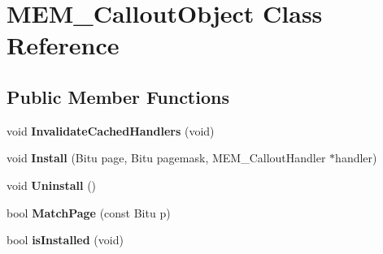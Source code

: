 \hypertarget{classMEM__CalloutObject}{\section{M\-E\-M\-\_\-\-Callout\-Object Class Reference}
\label{classMEM__CalloutObject}
}
\subsection*{Public Member Functions}
\begin{DoxyCompactItemize}
\item 
\hypertarget{classMEM__CalloutObject_aec2629c0c8e37f437ff88b811b72f4aa}{void {\bfseries Invalidate\-Cached\-Handlers} (void)}\label{classMEM__CalloutObject_aec2629c0c8e37f437ff88b811b72f4aa}

\item 
\hypertarget{classMEM__CalloutObject_abfc4ec4ff30364d9eee602bd0bc0258e}{void {\bfseries Install} (Bitu page, Bitu pagemask, M\-E\-M\-\_\-\-Callout\-Handler $\ast$handler)}\label{classMEM__CalloutObject_abfc4ec4ff30364d9eee602bd0bc0258e}

\item 
\hypertarget{classMEM__CalloutObject_ae18addfdccf0102276d0f8feac83cae9}{void {\bfseries Uninstall} ()}\label{classMEM__CalloutObject_ae18addfdccf0102276d0f8feac83cae9}

\item 
\hypertarget{classMEM__CalloutObject_a23fd9d61bb269101263cb95bb2f73e2d}{bool {\bfseries Match\-Page} (const Bitu p)}\label{classMEM__CalloutObject_a23fd9d61bb269101263cb95bb2f73e2d}

\item 
\hypertarget{classMEM__CalloutObject_a3edab31b384d02f28abcf1923e85190d}{bool {\bfseries is\-Installed} (void)}\label{classMEM__CalloutObject_a3edab31b384d02f28abcf1923e85190d}

\end{DoxyCompactItemize}
